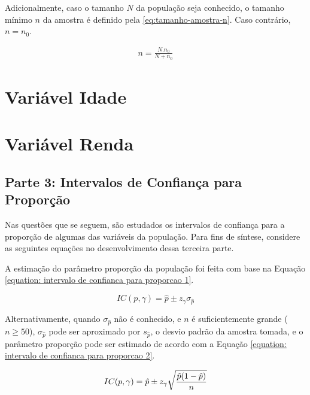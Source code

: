 \documentclass[10pt,a4paper,oneside]{article}
\begin{document}
	Adicionalmente, caso o tamanho $N$ da população seja conhecido, o tamanho mínimo $n$ da amostra
	é definido pela \autoref{eq:tamanho-amostra-n}. Caso contrário, $n = n_{0}$.

	\begin{align}
		\label{eq:tamanho-amostra-n}
		n = \frac{N . n_0}{N + n_0}
	\end{align}
	

\section{Variável Idade}
\label{questao:2}


\section{Variável Renda}
\label{questao:3}


\newpage
\begin{center}
	\section*{Parte 3: Intervalos de Confiança para Proporção}
\end{center}

	Nas questões que se seguem, são estudados os intervalos de confiança
	para a proporção de algumas das variáveis da população. Para fins de
	síntese, considere as seguintes equações no desenvolvimento dessa
	terceira parte.
	
	A estimação do parâmetro proporção da população foi feita com base na
	Equação \ref{equation: intervalo de confianca para proporcao 1}.

		\begin{equation}
			IC(p, \gamma) = \hat{p} \pm z_\gamma \sigma_{\hat{p}}
			\label{equation: intervalo de confianca para proporcao 1}
		\end{equation}
	
	Alternativamente, quando $\sigma_{\hat{p}}$ não é conhecido, e $n$ é
	suficientemente grande ($n \geq 50$), $\sigma_{\hat{p}}$ pode
	ser aproximado por $s_{\hat{p}}$, o desvio padrão da amostra tomada, e o
	parâmetro proporção pode ser estimado de acordo com a Equação
	\ref{equation: intervalo de confianca para proporcao 2}.

		\begin{equation}
			IC(p, \gamma) = \hat{p} \pm z_\gamma \sqrt{\frac{\hat{p}(1-\hat{p})}{n}} \\
			\label{equation: intervalo de confianca para proporcao 2}
		\end{equation}
	
\end{document}

